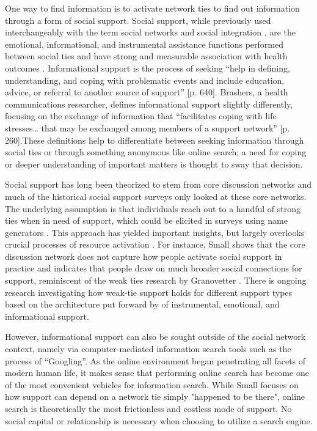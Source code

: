 One way to find information is to activate network ties to find out information
through a form of social support. Social support, while previously used
interchangeably with the term social networks and social integration
\citep{houseStructuresProcessesSocial1988}, are the emotional, informational, and
instrumental assistance functions performed between social ties and have strong
and measurable association with health outcomes
\citep{houseMeasuresConceptsSocial1985, thoitsMechanismsLinkingSocial2011}.
Informational support is the process of seeking “help in defining,
understanding, and coping with problematic events and include education, advice,
or referral to another source of support” \citep{winemiller_etal93}[p. 640].
Brashers, a health communications researcher, defines informational support
slightly differently, focusing on the exchange of information that “facilitates
coping with life stresses… that may be exchanged among members of a support
network” \citet{brashersInformationSeekingAvoiding2002}[p. 260].These definitions
help to differentiate between seeking information through social ties or through
something anonymous like online search; a need for coping or deeper
understanding of important matters is thought to sway that decision.

Social support has long been theorized to stem from core discussion networks and
much of the historical social support surveys only looked at these core
networks. The underlying assumption is that individuals reach out to a handful
of strong ties when in need of support, which could be elicited in surveys using
name generators \citep{marsdenCoreDiscussionNetworks1987}. This approach has yielded
important insights, but largely overlooks crucial
processes of resource activation \citep{hurlbertCoreNetworksTie2000,
perrySocialNetworkActivation2015, smithDonPutMy2005}. For instance, Small
\citet{smallSomeoneTalk2017} shows that the core discussion network does not capture
how people activate social support in practice and indicates that people draw on
much broader social connections for support, reminiscent of the weak ties
research by Granovetter \citet{granovetterStrengthWeakTies1973}. There is ongoing
research investigating how weak-tie support holds for different support types
based on the architecture put forward by 
\citet{houseStructuresProcessesSocial1988} of instrumental, emotional, and
informational support. 

However, informational support can also be sought outside of the social network
context, namely via computer-mediated information search tools such as the
process of “Googling”. As the online environment began penetrating all facets of
modern human life, it makes sense that performing online search has become one
of the most convenient vehicles for information search. While Small
\citet{smallSomeoneTalk2017} focuses on how support can depend on a network tie
simply "happened to be there", online search is theoretically the most
frictionless and costless mode of support. No social capital or relationship is
necessary when choosing to utilize a search engine. 

